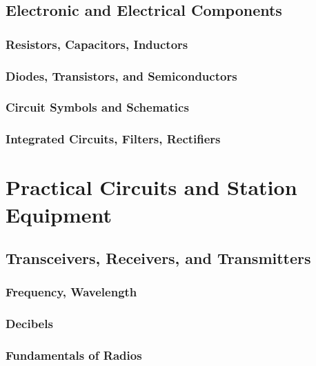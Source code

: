 \documentclass[12pt]{book}
\begin{document}
\chapter{Electronic and Electrical Components}
\section{Resistors, Capacitors, Inductors}

\section{Diodes, Transistors, and Semiconductors}


\section{Circuit Symbols and Schematics}

\section{Integrated Circuits, Filters, Rectifiers}


\part{Practical Circuits and Station Equipment}
\chapter{Transceivers, Receivers, and Transmitters}
\section{Frequency, Wavelength}


\section{Decibels}

\section{Fundamentals of Radios}



\end{document}
